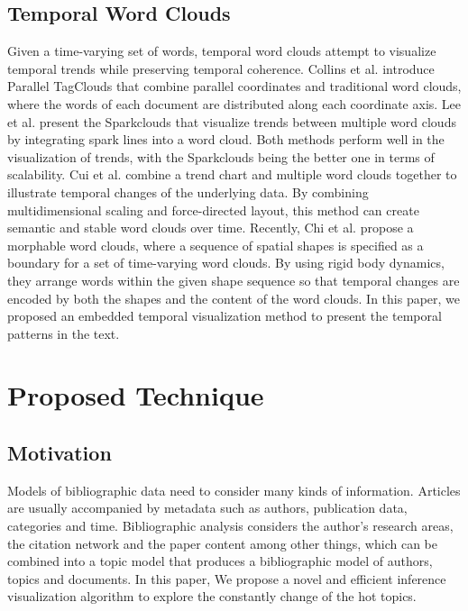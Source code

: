 \documentclass[12pt]{iopart}
\begin{document}
\subsection{Temporal Word Clouds}

Given a time-varying set of words, temporal word clouds attempt to visualize temporal trends while preserving temporal coherence. Collins et al. \cite{Collins:cn} introduce Parallel TagClouds that combine parallel coordinates and traditional word clouds, where the words of each document are distributed along each coordinate axis. Lee et al. \cite{BongshinLee:gz} present the Sparkclouds that visualize trends between multiple word clouds by integrating spark lines into a word cloud. Both methods perform well in the visualization of trends, with the Sparkclouds being the better one in terms of scalability. Cui et al. \cite{Cui:jj} combine a trend chart and multiple word clouds together to illustrate temporal changes of the underlying data. By combining multidimensional scaling and force-directed layout, this method can create semantic and stable word clouds over time. Recently, Chi et al. \cite{Chi:gr} propose a morphable word clouds, where a sequence of spatial shapes is specified as a boundary for a set of time-varying word clouds. By using rigid body dynamics, they arrange words within the given shape sequence so that temporal changes are encoded by both the shapes and the content of the word clouds. In this paper, we proposed an embedded temporal visualization method to present the temporal patterns in the text.

\section{Proposed Technique}

\subsection{Motivation}

Models of bibliographic data need to consider many kinds of information. Articles are usually accompanied by metadata such as authors, publication data, categories and time\cite{Lim2016}. Bibliographic analysis considers the author’s research areas, the citation network and the paper content among other things, which can be combined into a topic model that produces a bibliographic model of authors, topics and documents. In this paper, We propose a novel and efficient inference visualization algorithm to explore the constantly change of the hot topics.
\end{document}
